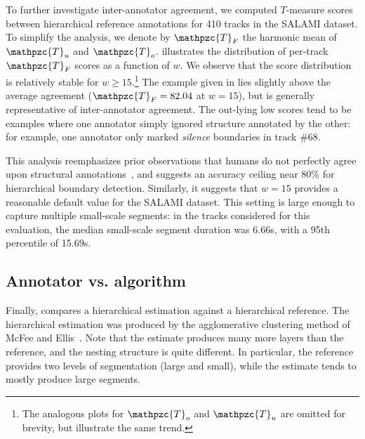\documentclass{article}
\def\shag{\ensuremath{\mathpzc{T}}}
\begin{document}
To further investigate inter-annotator agreement, we computed $T$-measure scores between hierarchical
reference annotations for 410 tracks in the SALAMI dataset.  To simplify the analysis, we denote by $\shag_F$
the harmonic mean of $\shag_u$ and $\shag_o$.   illustrates the distribution of
per-track $\shag_F$ scores as a function of $w$.  We observe that the score distribution is relatively stable
for $w \geq 15$.\footnote{The analogous plots for $\shag_o$ and $\shag_u$ are omitted for brevity, but illustrate the same
trend.} 
The example given in  lies slightly above the average agreement ($\shag_F = 82.04$ at
$w=15$),
but is generally representative of inter-annotator agreement.
The out-lying low scores tend to be examples where one annotator simply ignored structure annotated
by the other: for example, one annotator only marked \emph{silence} boundaries in track \#68.

This analysis reemphasizes prior observations that humans do not perfectly agree upon structural
annotations~\cite{Smith2013}, and suggests an accuracy ceiling near 80\% for hierarchical boundary detection.
Similarly, it suggests that $w=15$ provides a reasonable default value for the SALAMI dataset.  This setting
is large enough to capture multiple small-scale segments: in the tracks considered for this evaluation, 
the median small-scale segment duration was 6.66s, with a 95th percentile of 15.69s.

\subsection{Annotator vs. algorithm}
Finally,  compares a hierarchical estimation against a hierarchical reference.
The hierarchical estimation was produced by the agglomerative clustering method of McFee and Ellis~\cite{McFee2014}.
Note that the estimate produces many more layers than the reference, and the nesting structure is quite different.
In particular, the reference provides two levels of segmentation (large and small), while the estimate tends
to mostly produce large segments.
\end{document}
